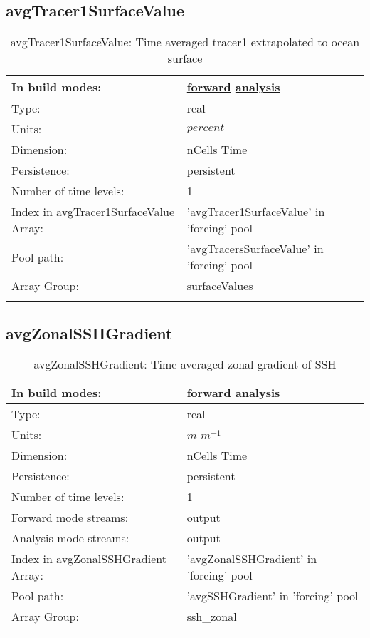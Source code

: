 \subsection[avgTracer1SurfaceValue]{avgTracer1SurfaceValue}
\label{subsec:var_sec_forcing_avgTracer1SurfaceValue}
\begin{center}
\begin{longtable}{| p{2.0in} | p{4.0in} |}
        \hline 
        In build modes: & \hyperref[subsec:forward_var_tab_forcing]{forward} \hyperref[subsec:analysis_var_tab_forcing]{analysis} \\
        \hline 
        Type: & real \\
        \hline 
        Units: & $percent$ \\
        \hline 
        Dimension: & nCells Time \\
        \hline 
        Persistence: & persistent \\
        \hline 
        Number of time levels: & 1 \\
        \hline 
		 Index in avgTracer1SurfaceValue Array: & 'avgTracer1SurfaceValue' in 'forcing' pool \\
		 \hline 
            Pool path: & 'avgTracersSurfaceValue' in 'forcing' pool
 \\
		 \hline 
		 Array Group: & surfaceValues \\
		 \hline 
    \caption{avgTracer1SurfaceValue: Time averaged tracer1 extrapolated to ocean surface}
\end{longtable}
\end{center}
\subsection[avgZonalSSHGradient]{avgZonalSSHGradient}
\label{subsec:var_sec_forcing_avgZonalSSHGradient}
\begin{center}
\begin{longtable}{| p{2.0in} | p{4.0in} |}
        \hline 
        In build modes: & \hyperref[subsec:forward_var_tab_forcing]{forward} \hyperref[subsec:analysis_var_tab_forcing]{analysis} \\
        \hline 
        Type: & real \\
        \hline 
        Units: & $m$ $m^{-1}$ \\
        \hline 
        Dimension: & nCells Time \\
        \hline 
        Persistence: & persistent \\
        \hline 
        Number of time levels: & 1 \\
        \hline 
		 Forward mode streams: &  output \\
        \hline 
		 Analysis mode streams: &  output \\
        \hline 
		 Index in avgZonalSSHGradient Array: & 'avgZonalSSHGradient' in 'forcing' pool \\
		 \hline 
            Pool path: & 'avgSSHGradient' in 'forcing' pool
 \\
		 \hline 
		 Array Group: & ssh\_zonal \\
		 \hline 
    \caption{avgZonalSSHGradient: Time averaged zonal gradient of SSH}
\end{longtable}
\end{center}
